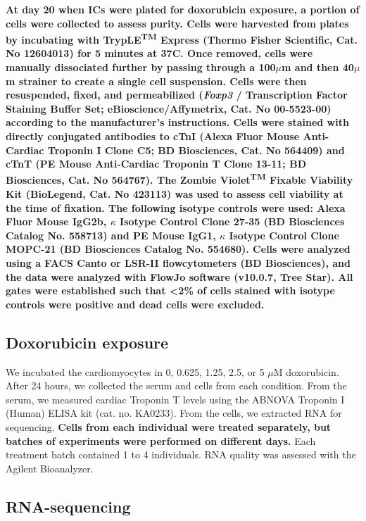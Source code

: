 \documentclass{article}
\newcommand{\tempbold}[1]{\textbf{#1}}
\begin{document}
\tempbold{At day 20 when ICs were plated for doxorubicin exposure, a portion of cells were collected to assess purity. Cells were harvested from plates by incubating with TrypLE\textsuperscript{TM} Express (Thermo Fisher Scientific, Cat. No 12604013) for 5 minutes at 37\textdegree{}C. Once removed, cells were manually dissociated further by passing through a 100$\mu$m and then 40$\mu$m strainer to create a single cell suspension. Cells were then resuspended, fixed, and permeabilized (\emph{Foxp3} / Transcription Factor Staining Buffer Set; eBioscience/Affymetrix, Cat. No 00-5523-00) according to the manufacturer's instructions. Cells were stained with directly conjugated antibodies to cTnI (Alexa Fluor\textregistered 647 Mouse Anti-Cardiac Troponin I Clone C5; BD Biosciences, Cat. No 564409) and cTnT (PE Mouse Anti-Cardiac Troponin T Clone 13-11; BD Biosciences, Cat. No 564767). The Zombie Violet\textsuperscript{TM} Fixable Viability Kit (BioLegend, Cat. No 423113) was used to assess cell viability at the time of fixation. The following isotype controls were used: Alexa Fluor\textregistered 647 Mouse IgG2b, $\kappa$ Isotype Control Clone 27-35 (BD Biosciences Catalog No. 558713) and PE Mouse IgG1, $\kappa$ Isotype Control Clone MOPC-21 (BD Biosciences Catalog No. 554680). Cells were analyzed using a FACS Canto or LSR-II flowcytometers (BD Biosciences), and the data were analyzed with FlowJo software (v10.0.7, Tree Star). All gates were established such that <2\% of cells stained with isotype controls were positive and dead cells were excluded.}

\subsection*{Doxorubicin exposure}

We incubated the cardiomyocytes in 0, 0.625, 1.25, 2.5, or 5 $\mu$M
doxorubicin. After 24 hours, we collected the serum and cells from each
condition. From the serum, we measured cardiac Troponin T levels using the
ABNOVA Troponin I (Human) ELISA kit (cat. no. KA0233). From the cells, we
extracted RNA for sequencing. \tempbold{Cells from each individual were treated separately, but batches of experiments were performed on different days.} Each treatment batch contained 1 to 4
individuals. RNA quality was assessed with the Agilent Bioanalyzer.

\subsection*{RNA-sequencing}
\end{document}

